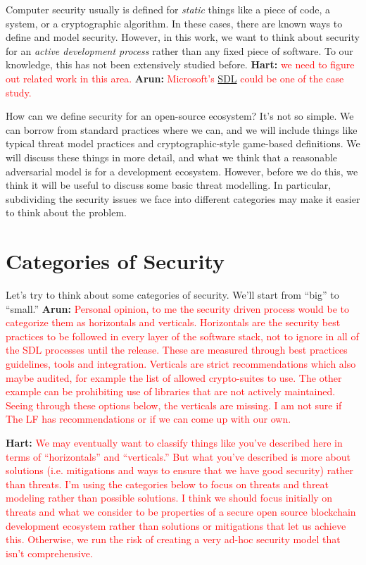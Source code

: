 
Computer security usually is defined for \emph{static} things like a piece of code, a system, or a cryptographic algorithm.  In these cases, there are known ways to define and model security.  However, in this work, we want to think about security for an \emph{active development process} rather than any fixed piece of software.  To our knowledge, this has not been extensively studied before.  \textbf{Hart:} \textcolor{red}{we need to figure out related work in this area.}  \textbf{Arun:} \textcolor{red}{Microsoft's \href{https://www.microsoft.com/en-us/securityengineering/sdl}{SDL} could be one of the case study.}

How can we define security for an open-source ecosystem?  It's not so simple.  We can borrow from standard practices where we can, and we will include things like typical threat model practices and cryptographic-style game-based definitions.  We will discuss these things in more detail, and what we think that a reasonable adversarial model is for a development ecosystem.  However, before we do this, we think it will be useful to discuss some basic threat modelling.  In particular, subdividing the security issues we face into different categories may make it easier to think about the problem.

\section{Categories of Security}
Let's try to think about some categories of security.  We'll start from ``big'' to ``small.'' \textbf{Arun:} \textcolor{red}{Personal opinion, to me the security driven process would be to categorize them as horizontals and verticals. Horizontals are the security best practices to be followed in every layer of the software stack, not to ignore in all of the SDL processes until the release. These are measured through best practices guidelines, tools and integration. Verticals are strict recommendations which also maybe audited, for example the list of allowed crypto-suites to use. The other example can be prohibiting use of libraries that are not actively maintained. Seeing through these options below, the verticals are missing. I am not sure if The LF has recommendations or if we can come up with our own.}

\textbf{Hart:} \textcolor{red}{ We may eventually want to classify things like you've described here in terms of ``horizontals'' and ``verticals.''  But what you've described is more about solutions (i.e. mitigations and ways to ensure that we have good security) rather than threats.  I'm using the categories below to focus on threats and threat modeling rather than possible solutions.  I think we should focus initially on threats and what we consider to be properties of a secure open source blockchain development ecosystem rather than solutions or mitigations that let us achieve this.  Otherwise, we run the risk of creating a very ad-hoc security model that isn't comprehensive.}

